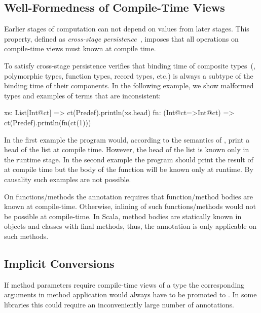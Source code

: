 \subsection{Well-Formedness of Compile-Time Views}
\label{sct:wf-ctv}

Earlier stages of computation can not depend on values from later stages. This property,
 defined as \emph{cross-stage persistence}~\cite{taha_multi-stage_1997,westbrook2010mint},
 imposes that all operations on compile-time views must known at compile time.

To satisfy cross-stage persistence \tool verifies that binding time of composite
 types~(\eg, polymorphic types, function types, record types, etc.) is always
 a subtype of the binding time of their components. In the following example,
 we show malformed types and examples of terms that are inconsistent:\begin{lstparagraph}
xs: List[Int@ct]     => ct(Predef).println(xs.head)
fn: (Int@ct=>Int@ct) => ct(Predef).println(fn(ct(1)))
\end{lstparagraph}

In the first example the program would, according to the semantics of , print a head of the list at compile time.
 However, the head of the list is known only in the runtime stage. In the second example the program should
 print the result of  at compile time but the body of the function will
 be known only at runtime. By causality such examples are not possible.

On functions/methods the  annotation requires that function/method bodies are known at compile-time.
 Otherwise, inlining of such functions/methods would not be possible at compile-time. In Scala,
 method bodies are statically known in objects and classes with final methods, thus, the 
 annotation is only applicable on such methods.

\subsection{Implicit Conversions}
\label{sct:implicits}

If method parameters require compile-time views of a type the corresponding arguments
 in method application would always have to be promoted to .
 In some libraries this could require an inconveniently large number
 of annotations.

